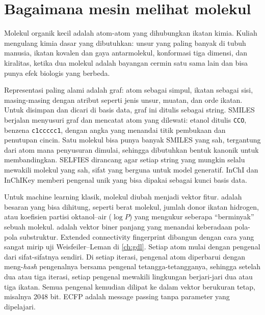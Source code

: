 \section{Bagaimana mesin melihat molekul}

Molekul organik kecil adalah atom-atom yang dihubungkan ikatan kimia. Kuliah mengulang kimia dasar yang dibutuhkan:
unsur yang paling banyak di tubuh manusia, ikatan kovalen dan gaya antarmolekul, konformasi tiga dimensi, dan
kiralitas, ketika dua molekul adalah bayangan cermin satu sama lain dan bisa punya efek biologis yang berbeda.

Representasi paling alami adalah graf: atom sebagai simpul, ikatan sebagai sisi, masing-masing dengan atribut seperti
jenis unsur, muatan, dan orde ikatan. Untuk disimpan dan dicari di basis data, graf ini ditulis sebagai string. SMILES
\citep{weininger1988} berjalan menyusuri graf dan mencatat atom yang dilewati: etanol ditulis \texttt{CCO}, benzena
\texttt{c1ccccc1}, dengan angka yang menandai titik pembukaan dan penutupan cincin. Satu molekul bisa punya banyak SMILES
yang sah, tergantung dari atom mana penyusuran dimulai, sehingga dibutuhkan bentuk kanonik untuk membandingkan. SELFIES
dirancang agar setiap string yang mungkin selalu mewakili molekul yang sah, sifat yang berguna untuk model generatif.
InChI dan InChIKey memberi pengenal unik yang bisa dipakai sebagai kunci basis data.

Untuk machine learning klasik, molekul diubah menjadi vektor fitur.  adalah besaran yang
bisa dihitung, seperti berat molekul, jumlah donor ikatan hidrogen, atau koefisien partisi oktanol--air ($\log P$) yang
mengukur seberapa ``berminyak'' sebuah molekul.  adalah vektor biner panjang yang menandai
keberadaan pola-pola substruktur. Extended connectivity fingerprint \citep{rogers2010} dibangun dengan cara yang sangat
mirip uji Weisfeiler--Leman di \cref{ch:gdl}. Setiap atom mulai dengan pengenal dari sifat-sifatnya sendiri. Di setiap
iterasi, pengenal atom diperbarui dengan meng-\emph{hash} pengenalnya bersama pengenal tetangga-tetangganya, sehingga
setelah dua atau tiga iterasi, setiap pengenal mewakili lingkungan berjari-jari dua atau tiga ikatan. Semua pengenal
kemudian dilipat ke dalam vektor berukuran tetap, misalnya 2048 bit. ECFP adalah message passing tanpa parameter yang
dipelajari.

